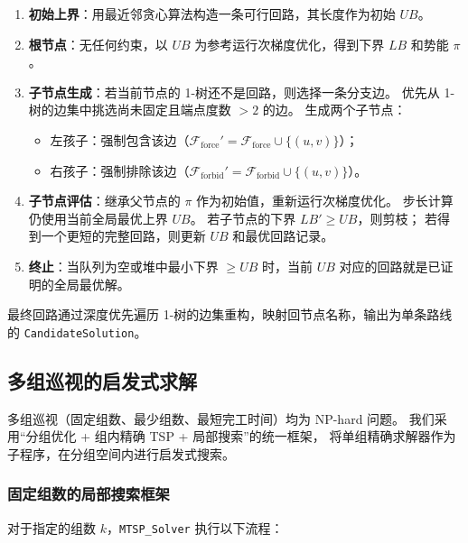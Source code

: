 \documentclass[a4paper, 12pt]{article}
\begin{document}
\begin{enumerate}
    \item \textbf{初始上界}：用最近邻贪心算法构造一条可行回路，其长度作为初始 $UB$。
    \item \textbf{根节点}：无任何约束，以 $UB$ 为参考运行次梯度优化，得到下界 $LB$ 和势能 $\pi$。
    \item \textbf{子节点生成}：若当前节点的 1-树还不是回路，则选择一条分支边。
          优先从 1-树的边集中挑选尚未固定且端点度数 $>2$ 的边。
          生成两个子节点：
          \begin{itemize}
              \item 左孩子：强制包含该边（$\mathcal{F}_{\text{force}}' = \mathcal{F}_{\text{force}} \cup \{(u,v)\}$）；
              \item 右孩子：强制排除该边（$\mathcal{F}_{\text{forbid}}' = \mathcal{F}_{\text{forbid}} \cup \{(u,v)\}$）。
          \end{itemize}
    \item \textbf{子节点评估}：继承父节点的 $\pi$ 作为初始值，重新运行次梯度优化。
          步长计算仍使用当前全局最优上界 $UB$。
          若子节点的下界 $LB' \ge UB$，则剪枝；
          若得到一个更短的完整回路，则更新 $UB$ 和最优回路记录。
    \item \textbf{终止}：当队列为空或堆中最小下界 $\ge UB$ 时，当前 $UB$ 对应的回路就是已证明的全局最优解。
\end{enumerate}

最终回路通过深度优先遍历 1-树的边集重构，映射回节点名称，输出为单条路线的 \texttt{CandidateSolution}。

\subsection{多组巡视的启发式求解}

多组巡视（固定组数、最少组数、最短完工时间）均为 NP-hard 问题。
我们采用“分组优化 + 组内精确 TSP + 局部搜索”的统一框架，
将单组精确求解器作为子程序，在分组空间内进行启发式搜索。

\subsubsection{固定组数的局部搜索框架}

对于指定的组数 $k$，\texttt{MTSP\_Solver} 执行以下流程：
\end{document}
